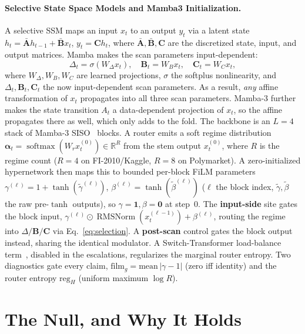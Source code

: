 \documentclass{article}
\newcommand{\R}{\mathbb{R}}
\DeclareMathOperator{\softmaxop}{softmax}
\newcommand{\softmax}{\softmaxop}
\DeclareMathOperator{\RMSNorm}{RMSNorm}
\begin{document}
\paragraph{Selective State Space Models and Mamba3 Initialization.}
A selective SSM maps an input $x_t$ to an output $y_t$ via a latent state
$h_t=\bar{\mathbf{A}}h_{t-1}+\bar{\mathbf{B}}x_t$, $y_t=\mathbf{C}h_t$, where
$\bar{\mathbf{A}},\bar{\mathbf{B}},\mathbf{C}$ are the discretized state, input,
and output matrices. Mamba makes the scan parameters input-dependent:
\begin{equation}\label{eq:selection}
\Delta_t=\sigma(W_\Delta x_t),\quad \mathbf{B}_t=W_B x_t,\quad \mathbf{C}_t=W_C x_t,
\end{equation}
where $W_\Delta,W_B,W_C$ are learned projections, $\sigma$ the softplus nonlinearity, and $\Delta_t,\mathbf{B}_t,\mathbf{C}_t$ the now input-dependent scan parameters. As a result, \emph{any} affine transformation of $x_t$ propagates into all three scan
parameters. Mamba-3 further makes the state transition $A_t$ a data-dependent
projection of $x_t$, so the affine propagates there as well, which only adds to the
fold. The backbone is an $L{=}4$ stack of Mamba-3
SISO~\citep{lahoti2026mamba3} blocks. A router emits a soft regime distribution
$\bm{\alpha}_t=\softmax(W_r x_t^{(0)})\in\R^R$ from the stem output $x_t^{(0)}$,
where $R$ is the regime count ($R{=}4$ on FI-2010/Kaggle, $R{=}8$ on Polymarket).
A zero-initialized hypernetwork then maps this to bounded per-block FiLM
parameters $\gamma^{(\ell)}=1+\tanh(\tilde\gamma^{(\ell)})$,
$\beta^{(\ell)}=\tanh(\tilde\beta^{(\ell)})$ ($\ell$ the block index,
$\tilde\gamma,\tilde\beta$ the raw pre-$\tanh$ outputs), so
$\gamma{=}\mathbf{1},\beta{=}\mathbf{0}$ at step~0. The \textbf{input-side} site gates the block input,
$\gamma^{(\ell)}\odot\RMSNorm(x_t^{(\ell-1)})+\beta^{(\ell)}$, routing the regime
into $\Delta/\mathbf{B}/\mathbf{C}$ via Eq.~\eqref{eq:selection}. A
\textbf{post-scan} control gates the block output instead, sharing the identical
modulator. A Switch-Transformer load-balance term~\citep{fedus2022switch},
disabled in the escalations, regularizes the marginal router entropy. Two
diagnostics gate every claim, $\mathrm{film}_g=\mathrm{mean}\,|\gamma-1|$ (zero iff
identity) and the router entropy $\mathrm{reg}_H$ (uniform maximum $\log R$).

\section{The Null, and Why It Holds}\label{sec:null}
\end{document}
